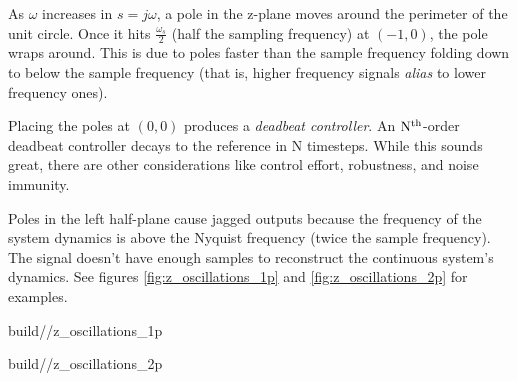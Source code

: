 As $\omega$ increases in $s = j\omega$, a pole in the z-plane moves around the
perimeter of the unit circle. Once it hits $\frac{\omega_s}{2}$ (half the
sampling frequency) at $(-1, 0)$, the pole wraps around. This is due to poles
faster than the sample frequency folding down to below the sample frequency
(that is, higher frequency signals \textit{alias} to lower frequency ones).

Placing the poles at $(0, 0)$ produces a \textit{deadbeat controller}. An
$\rm N^{th}$-order deadbeat controller decays to the \gls{reference} in N
timesteps. While this sounds great, there are other considerations like
\gls{control effort}, \gls{robustness}, and \gls{noise immunity}.

Poles in the left half-plane cause jagged outputs because the frequency of the
\gls{system} dynamics is above the Nyquist frequency (twice the sample
frequency). The  signal doesn't have enough
samples to reconstruct the continuous \gls{system}'s dynamics. See figures
\ref{fig:z_oscillations_1p} and \ref{fig:z_oscillations_2p} for examples.
\begin{bookfigure}
  \begin{minisvg}{2}{build/\chapterpath/z_oscillations_1p}
    \caption{Single poles in various locations in z-plane}
    \label{fig:z_oscillations_1p}
  \end{minisvg}
  \hfill
  \begin{minisvg}{2}{build/\chapterpath/z_oscillations_2p}
    \caption{Complex conjugate poles in various locations in z-plane}
    \label{fig:z_oscillations_2p}
  \end{minisvg}
\end{bookfigure}
